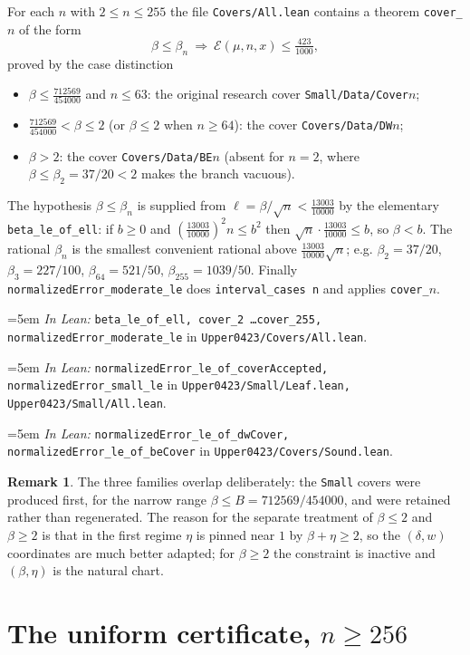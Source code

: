 \documentclass[11pt,a4paper]{article}
\theoremstyle{definition}
\newtheorem{remark}[theorem]{Remark}
\newcommand{\Lean}[1]{\texttt{#1}}
\newcommand{\file}[1]{\texttt{#1}}
\newcommand{\formal}[2]{%
  \par\smallskip
  \begingroup\small\raggedright\emergencystretch=5em
  \noindent\textit{In Lean:} \Lean{#1} in \file{#2}.\par
  \endgroup\smallskip}
\begin{document}
For each $n$ with $2\le n\le255$ the file \file{Covers/All.lean} contains a
theorem \Lean{cover\_}$n$ of the form
\[
  \beta\le\beta_n\ \Longrightarrow\
  \mathcal E(\mu,n,x)\le\tfrac{423}{1000},
\]
proved by the case distinction
\begin{itemize}[leftmargin=1.6em]
\item $\beta\le\tfrac{712569}{454000}$ and $n\le63$: the original research cover
  \file{Small/Data/Cover}$n$;
\item $\tfrac{712569}{454000}<\beta\le2$ (or $\beta\le2$ when $n\ge64$): the
  cover \file{Covers/Data/DW}$n$;
\item $\beta>2$: the cover \file{Covers/Data/BE}$n$ (absent for $n=2$, where
  $\beta\le\beta_2=37/20<2$ makes the branch vacuous).
\end{itemize}
The hypothesis $\beta\le\beta_n$ is supplied from
$\ell=\beta/\sqrt n<\tfrac{13003}{10000}$ by the elementary
\Lean{beta\_le\_of\_ell}: if $b\ge0$ and $(\tfrac{13003}{10000})^2n\le b^2$ then
$\sqrt n\cdot\tfrac{13003}{10000}\le b$, so $\beta<b$. The rational $\beta_n$ is
the smallest convenient rational above $\tfrac{13003}{10000}\sqrt n$; e.g.
$\beta_2=37/20$, $\beta_3=227/100$, $\beta_{64}=521/50$,
$\beta_{255}=1039/50$. Finally \Lean{normalizedError\_moderate\_le} does
\Lean{interval\_cases n} and applies \Lean{cover\_}$n$.
\formal{beta\_le\_of\_ell, cover\_2 \dots cover\_255, normalizedError\_moderate\_le}{Upper0423/Covers/All.lean}
\formal{normalizedError\_le\_of\_coverAccepted, normalizedError\_small\_le}{Upper0423/Small/Leaf.lean, Upper0423/Small/All.lean}
\formal{normalizedError\_le\_of\_dwCover, normalizedError\_le\_of\_beCover}{Upper0423/Covers/Sound.lean}

\begin{remark}
  The three families overlap deliberately: the \file{Small} covers were produced
  first, for the narrow range $\beta\le B=712569/454000$, and were retained
  rather than regenerated. The reason for the separate treatment of $\beta\le2$
  and $\beta\ge2$ is that in the first regime $\eta$ is pinned near $1$ by
  $\beta+\eta\ge2$, so the $(\delta,w)$ coordinates are much better adapted; for
  $\beta\ge2$ the constraint is inactive and $(\beta,\eta)$ is the natural chart.
\end{remark}

\section{The uniform certificate, $n\ge256$}
\label{sec:uniform}
\end{document}
